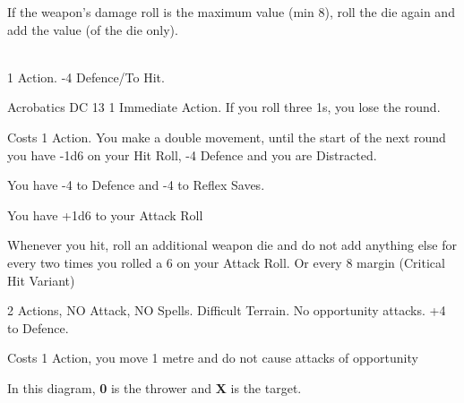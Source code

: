 \documentclass[landscape,10pt,a4paper]{article}
\begin{document}
\begin{multicols}{3}
\begin{dmbox}[title=Damage Explosion - page \pageref{damageexplosion}]
If the weapon's damage roll is the maximum value (min 8), roll the die again and add the value (of the die only).
\end{dmbox}

\begin{dmbox}[title=Standing Up From Prone - page \pageref{alzarsidaprono}]
\textbf{}\\
1 Action. -4 Defence/To Hit.

Acrobatics DC 13 1 Immediate Action. If you roll three 1s, you lose the round. 
\end{dmbox}



\begin{dmbox}[title=Dash Action - page \pageref{azionediscatto}]
Costs 1 Action. You make a double movement, until the start of the next round you have -1d6 on your Hit Roll, -4 Defence and you are Distracted.
\end{dmbox}

\begin{dmbox}[title=Defence Against Surprise - page \pageref{defenceandattack}]
You have -4 to Defence and -4 to Reflex Saves.
\end{dmbox}

\begin{dmbox}[title=Touch Attack - page \pageref{difesaatocco}]
You have +1d6 to your Attack Roll
\end{dmbox}

\begin{dmbox}[title=Critical Hit - page \pageref{criticalhit}]
Whenever you hit, roll an additional weapon die and do not add anything else for every two times you rolled a 6 on your Attack Roll. Or every 8 margin (Critical Hit Variant)
\end{dmbox}

\begin{dmbox}[title=Total Defence - page \pageref{totaldifence}]
2 Actions, NO Attack, NO Spells. Difficult Terrain. No opportunity attacks. +4 to Defence.
\end{dmbox}

\begin{dmbox}[title=Disengage - page \pageref{disingaggiare}]
Costs 1 Action, you move 1 metre and do not cause attacks of opportunity
\end{dmbox}

\begin{dmbox}[title=Scatter Ranged Weapons - page \pageref{attackswithscatterweapons}]
In this diagram, \textbf{0} is the thrower and \textbf{X} is the target.\\


\end{dmbox}
\end{multicols}
\end{document}
